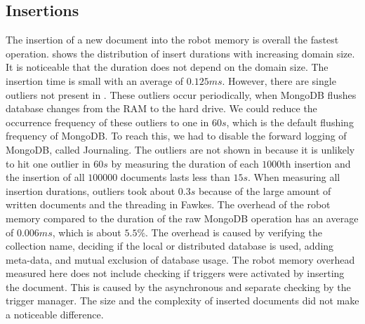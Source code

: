 \subsection{Insertions}
\label{sec:insertions}
The insertion of a new document into the robot memory is overall the
fastest operation.
 shows the distribution of
insert durations with increasing domain size. It is noticeable that the
duration does not depend on the domain size. The insertion time is small with an average of
$0.125ms$. However, there are single outliers not present in
. These outliers occur periodically, when
MongoDB flushes database changes from the RAM to the hard drive. We
could reduce the occurrence frequency of these outliers to one in $60s$, which is the
default flushing frequency of MongoDB. To reach this, we had to
disable the forward logging of MongoDB, called Journaling. The
outliers are not shown in 
because it is unlikely to hit one outlier in $60s$ by measuring the
duration of each $1000$th insertion and the insertion of all $100000$
documents lasts less than $15s$. When measuring all insertion durations,
outliers took about $0.3s$ because of the
large amount of written documents and the threading in Fawkes. The
overhead of the robot memory compared to the duration of the raw
MongoDB operation has an average of $0.006ms$, which is about $5.5\%$.
The overhead is caused by verifying the collection name, deciding if
the local or distributed database is used, adding meta-data, and
mutual exclusion of database usage. The robot memory overhead measured
here does not include checking if triggers were activated by inserting
the document. This is caused by the asynchronous and separate checking by
the trigger manager. The size and the complexity of inserted
documents did not make a noticeable difference.

